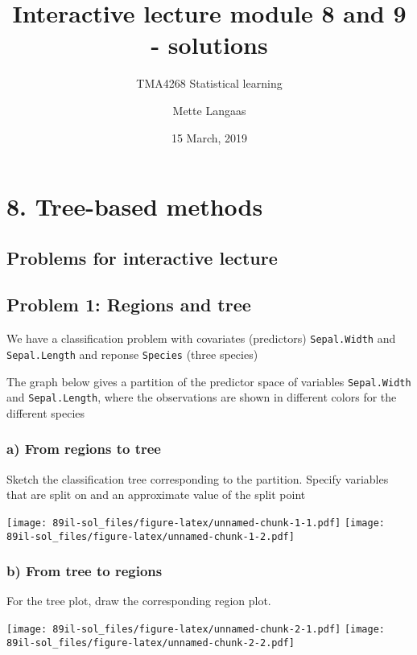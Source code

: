 \documentclass[]{article}
\title{Interactive lecture module 8 and 9 - solutions}
\subtitle{TMA4268 Statistical learning}
\author{Mette Langaas}
\date{15 March, 2019}
\begin{document}
\maketitle

{
\setcounter{tocdepth}{2}
\tableofcontents
}
\section{8. Tree-based methods}\label{tree-based-methods}

\subsection{Problems for interactive
lecture}\label{problems-for-interactive-lecture}

\subsection{Problem 1: Regions and
tree}\label{problem-1-regions-and-tree}

We have a classification problem with covariates (predictors)
\texttt{Sepal.Width} and \texttt{Sepal.Length} and reponse
\texttt{Species} (three species)

The graph below gives a partition of the predictor space of variables
\texttt{Sepal.Width} and \texttt{Sepal.Length}, where the observations
are shown in different colors for the different species

\subsubsection{a) From regions to tree}\label{a-from-regions-to-tree}

Sketch the classification tree corresponding to the partition. Specify
variables that are split on and an approximate value of the split point

\texttt{[image: 89il-sol\_files/figure-latex/unnamed-chunk-1-1.pdf]}
\texttt{[image: 89il-sol\_files/figure-latex/unnamed-chunk-1-2.pdf]}

\subsubsection{b) From tree to regions}\label{b-from-tree-to-regions}

For the tree plot, draw the corresponding region plot.

\texttt{[image: 89il-sol\_files/figure-latex/unnamed-chunk-2-1.pdf]}
\texttt{[image: 89il-sol\_files/figure-latex/unnamed-chunk-2-2.pdf]}
\end{document}
